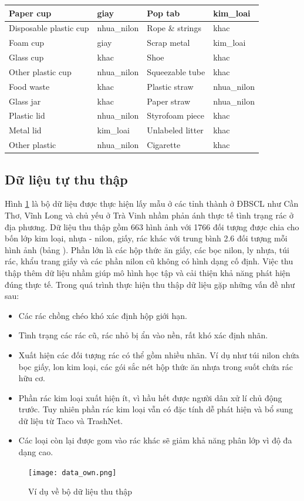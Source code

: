 \documentclass[../the.tex]{subfiles}
\begin{document}
\begin{table}[!ht]
\begin{tabular}{|l|l|l|l|}
        Paper cup & giay & Pop tab & kim\_loai \\ \hline
        Disposable plastic cup & nhua\_nilon & Rope \& strings & khac \\ \hline
        Foam cup & giay & Scrap metal & kim\_loai \\ \hline
        Glass cup & khac & Shoe & khac \\ \hline
        Other plastic cup & nhua\_nilon & Squeezable tube & khac \\ \hline
        Food waste & khac & Plastic straw & nhua\_nilon \\ \hline
        Glass jar & khac & Paper straw & nhua\_nilon \\ \hline
        Plastic lid & nhua\_nilon & Styrofoam piece & khac \\ \hline
        Metal lid & kim\_loai & Unlabeled litter & khac \\ \hline
        Other plastic & nhua\_nilon & Cigarette & khac \\ \hline
    \end{tabular}
	\label{tab:taco_map}
\end{table}
\subsection{Dữ liệu tự thu thập}
{\fontsize{13}{12} \selectfont
Hình \ref{fig:dataset_own} là bộ dữ liệu được thực hiện lấy mẫu ở các tỉnh thành ở ĐBSCL như Cần Thơ, Vĩnh Long và chủ yếu ở Trà Vinh nhầm phản ánh thực tế tình trạng rác ở địa phương. 
Dữ liệu thu thập gồm 663 hình ảnh với 1766 đối tượng được chia cho bốn lớp kim loại, nhựa - nilon, giấy, rác khác với trung bình 2.6 đối tượng mỗi hình ảnh (bảng ).
Phần lớn là các hộp thức ăn giấy, các bọc nilon, ly nhựa, túi rác, khẩu trang giấy và các phần nilon cũ không có hình dạng cố định. 
Việc thu thập thêm dữ liệu nhầm giúp mô hình học tập và cải thiện khả năng phát hiện đúng thực tế. Trong quá trình thực hiện thu thập dữ liệu gặp những vấn đề như sau:
\begin{itemize}
	\item Các rác chồng chéo khó xác định hộp giới hạn.
	\item Tình trạng các rác cũ, rác nhỏ bị ẩn vào nền, rất khó xác định nhãn.
	\item Xuất hiện các đối tượng rác có thể gồm nhiều nhãn. Ví dụ như túi nilon chứa bọc giấy, lon kim loại, các gói sắc nét hộp thức ăn nhựa trong suốt chứa rác hữu cơ.
	\item Phần rác kim loại xuất hiện ít, vì hầu hết được người dân xử lí chủ động trước. Tuy nhiên phần rác kim loại vẫn có đặc tính dễ phát hiện và bổ sung dữ liệu từ Taco \cite{proença2020taco} và TrashNet.
	\item Các loại còn lại được gom vào rác khác sẽ giảm khả năng phân lớp vì độ đa dạng cao.
\end{itemize}
\bigskip


}
\begin{figure}[H]
	\centering
	\texttt{[image: data\_own.png]}
	\caption{Ví dụ về bộ dữ liệu thu thập}
	\label{fig:dataset_own}
\end{figure}
\end{document}
